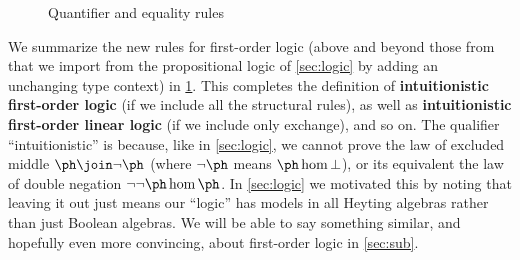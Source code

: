 
\begin{figure}
  \centering
  \caption{Quantifier and equality rules}
  \label{fig:fol}
\end{figure}

We summarize the new rules for first-order logic (above and beyond those from that we import from the propositional logic of \cref{sec:logic} by adding an unchanging type context) in \cref{fig:fol}.
This completes the definition of \textbf{intuitionistic first-order logic} (if we include all the structural rules), as well as \textbf{intuitionistic first-order linear logic} (if we include only exchange), and so on.
The qualifier ``intuitionistic'' is because, like in \cref{sec:logic}, we cannot prove the law of excluded middle $\ph\join\neg\ph$ (where $\neg\ph$ means $\ph\hom\bot$), or its equivalent the law of double negation $\neg\neg\ph\hom\ph$.
In \cref{sec:logic} we motivated this by noting that leaving it out just means our ``logic'' has models in all Heyting algebras rather than just Boolean algebras.
We will be able to say something similar, and hopefully even more convincing, about first-order logic in \cref{sec:sub}.

